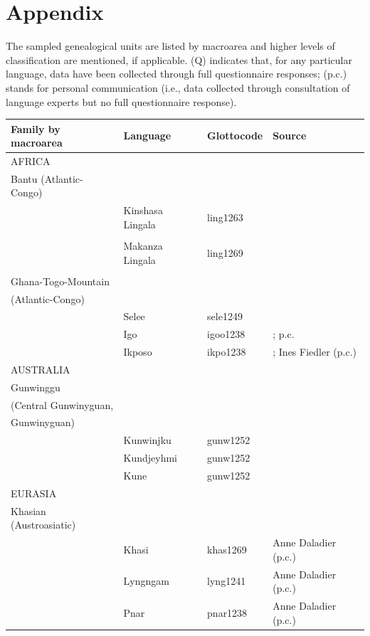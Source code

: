 \documentclass[output=collectionpaper]{langsci/langscibook}
\begin{document}
\section*{Appendix}
\label{appendix}
\scriptsize{The sampled genealogical units are listed by macroarea and higher levels of classification are mentioned, if applicable. (Q) indicates that, for any particular language, data have been collected through full questionnaire responses; (p.c.\@) stands for personal communication (i.e., data collected through consultation of language experts but no full questionnaire response).}
\begin{table}[htp!]
\scriptsize
 \begin{tabular}{llll} %
  \lsptoprule
Family by macroarea & Language &Glottocode & Source\\
\midrule
AFRICA &&&\\
\midrule
Bantu (Atlantic-Congo) & &&\\
&Kinshasa Lingala& ling1263 & \citet{Bokamba1977}\\
&&& \citet{Meeuwis2013}\\
& Makanza Lingala&ling1269 & \citet{Boeck1904,Bokamba1977}\\
&&& \citet{Meeuwis2013}\\
\midrule
Ghana-Togo-Mountain && & \\
(Atlantic-Congo)  && & \\
& Selee& sele1249 &  \citet{Agbetsoamedo2014}\\
&Igo&igoo1238 &  \citet{Gblem-Poidi2007}; p.c.\\
& Ikposo&ikpo1238 &\citet{Soubrier2013}; Ines Fiedler (p.c.)\\
\midrule
AUSTRALIA &&&\\
\midrule
 Gunwinggu && &\\
(Central Gunwinyguan, & &&\\
Gunwinyguan) & &&\\
& Kunwinjku&gunw1252 & \citet{Evans2003}\\
& Kundjeyhmi&gunw1252 & \citet{Evans2003} \\
& Kune&gunw1252 & \citet{Evans2003}\\
\midrule
EURASIA &&&\\
\midrule
Khasian (Austroasiatic)&  &&\\
&Khasi&khas1269 & Anne Daladier (p.c.)\\
&Lyngngam& lyng1241 & Anne Daladier (p.c.)\\
&Pnar&pnar1238 & Anne Daladier (p.c.)\\

\end{tabular}
\end{table}
\end{document}
